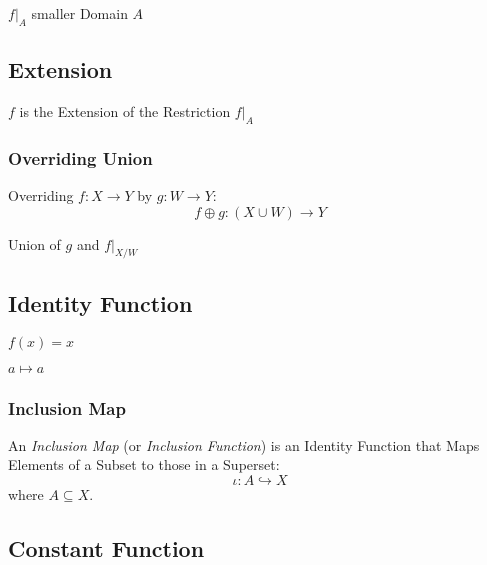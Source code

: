 $f|_A$ smaller Domain $A$



\subsection{Extension}\label{sec:function_extension}

$f$ is the Extension of the Restriction $f|_A$



\subsubsection{Overriding Union}\label{sec:overriding_union}

Overriding $f : X \rightarrow Y$ by $g : W \rightarrow Y$:
\[
  f \oplus g : (X \cup W) \rightarrow Y
\]

Union of $g$ and $f|_{X/W}$



\subsection{Identity Function}\label{sec:identity_function}

$f(x) = x$

$a \mapsto a$



\subsubsection{Inclusion Map}\label{sec:inclusion_map}

An \emph{Inclusion Map} (or \emph{Inclusion Function}) is an Identity
Function that Maps Elements of a Subset to those in a Superset:
\[
  \iota : A \hookrightarrow X
\]
where $A \subseteq X$.



\subsection{Constant Function}\label{sec:constant_function}

